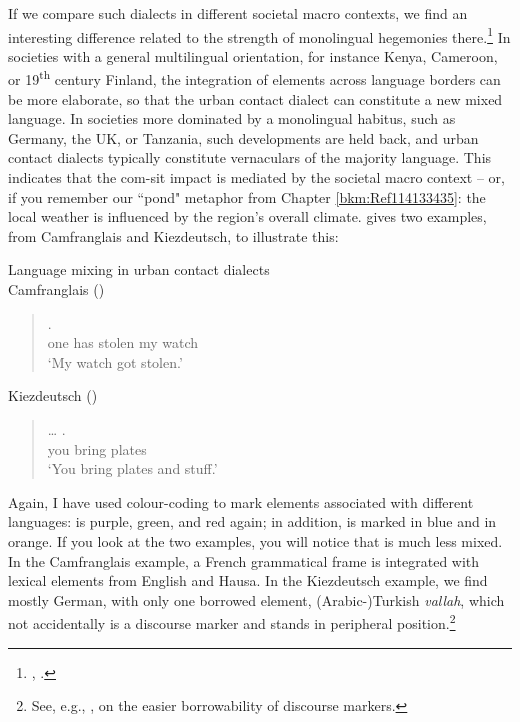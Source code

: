 If we compare such dialects in different societal macro contexts, we find an interesting difference related to the strength of monolingual hegemonies there.\footnote{\citet{Wiese2022}, \citet{KerswillWiese2022}.} In societies with a general multilingual orientation, for instance Kenya, Cameroon, or 19\textsuperscript{th} century Finland, the integration of elements across language borders can be more elaborate, so that the urban contact dialect can constitute a new mixed language. In societies more dominated by a monolingual habitus, such as Germany, the UK, or Tanzania, such developments are held back, and urban contact dialects typically constitute vernaculars of the majority language. This indicates that the com-sit impact is mediated by the societal macro context – or, if you remember our “pond" metaphor from Chapter \ref{bkm:Ref114133435}: the local weather is influenced by the region’s overall climate.  gives two examples, from Camfranglais and Kiezdeutsch, to illustrate this:

\ea\label{ex:4}
{\label{bkm:Ref82166863}  Language mixing in urban contact dialects}\\
\ea\label{bkm:Ref82166863a}
 Camfranglais (\citealt{KießlingMous2004})\\
 \begin{quote}
\gll {}           .\\
     one has stolen my   watch\\
\glt `My watch got stolen.'
\end{quote}
\ex\label{ex:4b}
Kiezdeutsch (\citealt{WiesePolat2016})\\
 \begin{quote}
\gll {}     … .\\
     you bring    plates  \\
\glt `You bring plates and stuff.'
\end{quote}
\z
\z

Again, I have used colour-coding to mark elements associated with different languages:  is purple,  green, and  red again; in addition,  is marked in blue and  in orange. If you look at the two examples, you will notice that  is much less mixed. In the Camfranglais example, a French grammatical frame is integrated with lexical elements from English and Hausa. In the Kiezdeutsch example, we find mostly German, with only one borrowed element, (Arabic-)Turkish \textit{vallah}, which not accidentally is a discourse marker and stands in peripheral position.\footnote{See, e.g., \citet{Fuller2001}, \citet{Matras2009} on the easier borrowability of discourse markers.}

